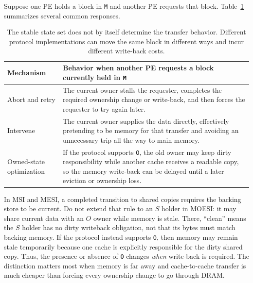 Suppose one PE holds a block in \texttt{M} and another PE requests that block.
Table~\ref{tab:sync-protocol-behavior} summarizes several common responses.
\begin{table}[t]
    \centering
    \renewcommand{\arraystretch}{1.15}
    \begin{tabular}{|p{1.8in}|p{4.0in}|}
        \hline
        Mechanism                & Behavior when another PE requests a block currently held in \texttt{M}                                                                                                                                           \\
        \hline
        Abort and retry          & The current owner stalls the requester, completes the required ownership change or write-back, and then forces the requester to try again later.                                                                 \\
        \hline
        Intervene                & The current owner supplies the data directly, effectively pretending to be memory for that transfer and avoiding an unnecessary trip all the way to main memory.                                                 \\
        \hline
        Owned-state optimization & If the protocol supports \texttt{O}, the old owner may keep dirty responsibility while another cache receives a readable copy, so the memory write-back can be delayed until a later eviction or ownership loss. \\
        \hline
    \end{tabular}
    \caption{The stable state set does not by itself determine the transfer behavior. Different protocol implementations can move the same block in different ways and incur different write-back costs.}
    \label{tab:sync-protocol-behavior}
\end{table}

In MSI and MESI, a completed transition to shared copies requires the backing store to be current.
Do not extend that rule to an $S$ holder in MOESI: it may share current data with an $O$ owner while memory is stale.
There, ``clean'' means the $S$ holder has no dirty writeback obligation, not that its bytes must match backing memory.
If the protocol instead supports \texttt{O}, then memory may remain stale temporarily because one cache is explicitly responsible for the dirty shared copy.
Thus, the presence or absence of \texttt{O} changes \emph{when} write-back is required.
The distinction matters most when memory is far away and cache-to-cache transfer is much cheaper than forcing every ownership change to go through DRAM\@.


